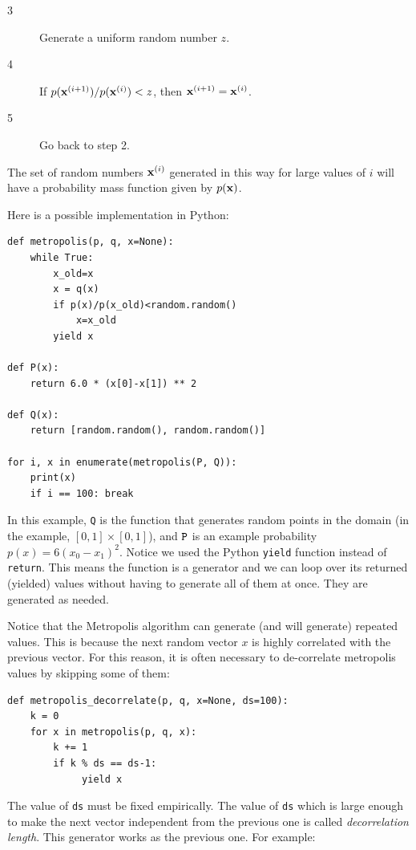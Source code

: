 \documentclass[justified, sixbynine]{tufte-book}
\def\ft{\small\tt}
\theoremstyle{plain}%
\newtheorem * {corollary}{Corollary}
\theoremstyle{definition}
\theoremstyle{remark}
\newtheorem * {remark}{Remark}
\newtheorem * {note}{Note}
\begin{document}
\begin{fullwidth}
\begin{description}
\item[3]  Generate a uniform random number $z$.

\item[4]  If $p({\bf x}^{(i+1)})/p({\bf x}^{(i)})<z$, then ${\bf x}^{(i+1)}=%
{\bf x}^{(i)}$.

\item[5]  Go back to step 2.
\end{description}

The set of random numbers ${\bf x}^{(i)}$ generated in this way for large
values of $i$ will have a probability mass function given by $p({\bf x})$.

Here is a possible implementation in Python:
\begin{lstlisting}
def metropolis(p, q, x=None):
    while True:
        x_old=x
        x = q(x)
        if p(x)/p(x_old)<random.random()
            x=x_old
        yield x

def P(x):
    return 6.0 * (x[0]-x[1]) ** 2

def Q(x):
    return [random.random(), random.random()]

for i, x in enumerate(metropolis(P, Q)):
    print(x)
    if i == 100: break
\end{lstlisting}

In this example, {\ft Q} is the function that generates random points in the domain (in the example, $[0, 1]\times[0, 1]$), and ${\ft P}$ is an example probability $p(x) = 6(x_0-x_1)^2$. Notice we used the Python {\ft yield} function instead of {\ft return}. This means the function is a generator and we can loop over its returned (yielded) values without having to generate all of them at once. They are generated as needed.


Notice that the Metropolis algorithm can generate (and will generate) repeated values. This is because the next random vector $x$ is highly correlated with the previous vector. For this reason, it is often necessary to de-correlate metropolis values by skipping some of them:

\begin{lstlisting}
def metropolis_decorrelate(p, q, x=None, ds=100):
    k = 0
    for x in metropolis(p, q, x):
        k += 1
        if k % ds == ds-1:
             yield x
\end{lstlisting}

The value of {\ft ds} must be fixed empirically. The value of {\ft ds} which is large enough to make the next vector independent from the previous one is called {\it decorrelation length}. This generator works as the previous one. For example:


\end{fullwidth}
\end{document}
